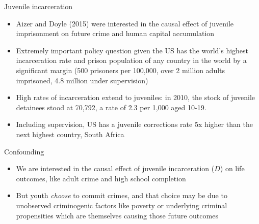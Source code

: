 \documentclass{beamer}
\begin{document}

\begin{frame}{Juvenile incarceration}

	\begin{itemize}
	\item Aizer and Doyle (2015) were interested in the causal effect of juvenile imprisonment on future crime and human capital accumulation
	\item Extremely important policy question given the US has the world's highest incarceration rate and prison population of any country in the world by a significant margin (500 prisoners per 100,000, over 2 million adults imprisoned, 4.8 million under supervision)
	\item High rates of incarceration extend to juveniles: in 2010, the stock of juvenile detainees stood at 70,792, a rate of 2.3 per 1,000 aged 10-19. 
	\item Including supervision, US has a juvenile corrections rate 5x higher than the next highest country, South Africa
	\end{itemize}
	
\end{frame}

\begin{frame}{Confounding}


		\begin{center}
		\end{center}
		
		\begin{itemize}
		\item We are interested in the causal effect of juvenile incarceration ($D$) on life outcomes, like adult crime and high school completion
		\item But youth \emph{choose} to commit crimes, and that choice may be due to unobserved criminogenic factors like poverty or underlying criminal propensities which are themselves causing those future outcomes
		\end{itemize}
		

\end{frame}
\end{document}
